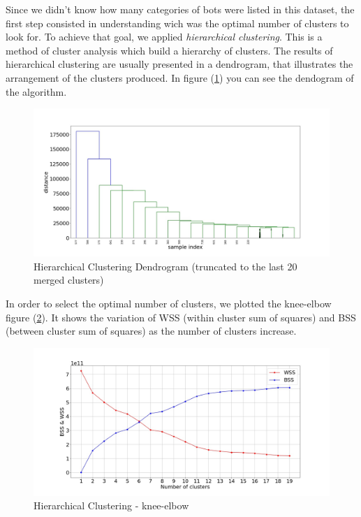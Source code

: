 \normalsize
\clearpage

Since we didn't know how many categories of bots were listed in this dataset, the first step consisted in understanding wich was the optimal number of clusters to look for. To achieve that goal, we applied \textit{hierarchical clustering}. This is a method of cluster analysis which build a hierarchy of clusters. The results of hierarchical clustering are usually presented in a dendrogram, that illustrates the arrangement of the clusters produced.
In figure (\ref{fig:dendogram}) you can see the dendogram of the algorithm.


\begin{figure}
	\includegraphics[width=\linewidth]{chapter3/figure/dendogram.jpg}
	\caption{Hierarchical Clustering Dendrogram (truncated to the last 20 merged clusters)}
	\label{fig:dendogram}
\end{figure}

In order to select the optimal number of clusters, we plotted the knee-elbow figure (\ref{fig:kneeelbow}). It shows the variation of WSS (within cluster sum of squares) and BSS (between cluster sum of squares) as the number of clusters increase.\\

\begin{figure} [htp!]
	\includegraphics[width=\linewidth]{chapter3/figure/kneeelbow.jpg}
	\caption{Hierarchical Clustering - knee-elbow}
	\label{fig:kneeelbow}
\end{figure}

